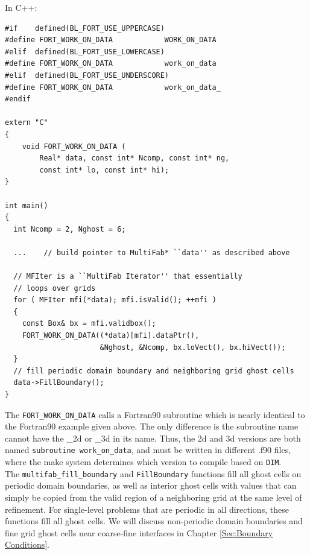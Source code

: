 In C++:
\begin{lstlisting}[backgroundcolor=\color{light-blue}]
#if    defined(BL_FORT_USE_UPPERCASE)
#define FORT_WORK_ON_DATA            WORK_ON_DATA
#elif  defined(BL_FORT_USE_LOWERCASE)
#define FORT_WORK_ON_DATA            work_on_data
#elif  defined(BL_FORT_USE_UNDERSCORE)
#define FORT_WORK_ON_DATA            work_on_data_
#endif

extern "C"
{
    void FORT_WORK_ON_DATA (
        Real* data, const int* Ncomp, const int* ng,
        const int* lo, const int* hi);
}

int main()
{
  int Ncomp = 2, Nghost = 6;

  ...    // build pointer to MultiFab* ``data'' as described above
  
  // MFIter is a ``MultiFab Iterator'' that essentially
  // loops over grids
  for ( MFIter mfi(*data); mfi.isValid(); ++mfi )
  {
    const Box& bx = mfi.validbox();
    FORT_WORK_ON_DATA((*data)[mfi].dataPtr(),
                      &Nghost, &Ncomp, bx.loVect(), bx.hiVect());
  }
  // fill periodic domain boundary and neighboring grid ghost cells
  data->FillBoundary();
}
\end{lstlisting}
The {\tt FORT\_WORK\_ON\_DATA} calls a Fortran90 subroutine which is nearly
identical to the Fortran90 example given above.  The only difference is the subroutine
name cannot have the \_2d or \_3d in its name.  Thus, the 2d and 3d versions
are both named {\tt subroutine work\_on\_data}, and must be written in
different .f90 files, where the make system determines which version to compile
based on {\tt DIM}.\\

The {\tt multifab\_fill\_boundary} and {\tt FillBoundary} functions 
fill all ghost cells on periodic domain boundaries, as well as interior
ghost cells with values that can simply be copied from the valid region of a neighboring
grid at the same level of refinement.  For single-level problems that are periodic
in all directions, these functions fill all ghost cells.  We will discuss
non-periodic domain boundaries and fine grid ghost cells near coarse-fine interfaces
in Chapter \ref{Sec:Boundary Conditions}.

